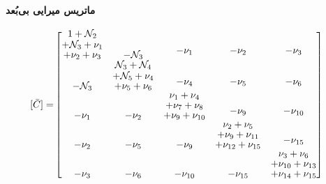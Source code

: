 \paragraph{ماتریس میرایی بی‌بُعد}
\begin{equation}\label{Eq.damping_matrix_dimensionless}
\begin{aligned}
[\bar{C}] = & 
\begin{bmatrix}
\shortstack{$1 + \mathcal{N}_2$ \\ $+ \mathcal{N}_3 + \nu_1$ \\ $+ \nu_2 + \nu_3$} & -\mathcal{N}_3 & \shortstack{$-\nu_1$ \\ \,} & \shortstack{$-\nu_2$ \\ \,} & \shortstack{$-\nu_3$ \\ \,} \\
-\mathcal{N}_3 & \shortstack{$\mathcal{N}_3 + \mathcal{N}_4$ \\ $+ \mathcal{N}_5 + \nu_4$ \\ $+ \nu_5 + \nu_6$} & \shortstack{$-\nu_4$ \\ \,} & \shortstack{$-\nu_5$ \\ \,} & \shortstack{$-\nu_6$ \\ \,} \\
-\nu_1 & -\nu_2 & \shortstack{$\nu_1 + \nu_4$ \\ $+ \nu_7 + \nu_8$ \\ $+ \nu_9 + \nu_{10}$} & \shortstack{$-\nu_9$ \\ \,} & \shortstack{$-\nu_{10}$ \\ \,} \\
-\nu_2 & -\nu_5 & -\nu_9 & \shortstack{$\nu_2 + \nu_5$ \\ $+ \nu_9 + \nu_{11}$ \\ $+ \nu_{12} + \nu_{15}$} & \shortstack{$-\nu_{15}$ \\ \,} \\
-\nu_3 & -\nu_{6} & -\nu_{10} & -\nu_{15} & \shortstack{$\nu_3 + \nu_6$ \\ $+ \nu_{10} + \nu_{13}$ \\ $+ \nu_{14} + \nu_{15}$}
\end{bmatrix}
\end{aligned}
\end{equation}

